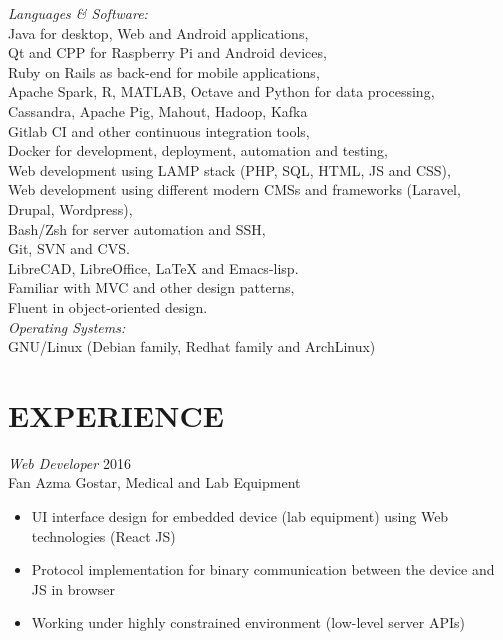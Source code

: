 \documentclass[margin, 10pt]{res} %
\begin{document}
\begin{resume}
{\sl Languages \& Software:} \\
Java for desktop, Web and Android applications, \\
Qt and CPP for Raspberry Pi and Android devices, \\
Ruby on Rails as back-end for mobile applications, \\
Apache Spark, R, MATLAB, Octave and Python for data processing, \\
Cassandra, Apache Pig, Mahout, Hadoop, Kafka \\
Gitlab CI and other continuous integration tools, \\
Docker for development, deployment, automation and testing, \\
Web development using LAMP stack (PHP, SQL, HTML, JS and CSS), \\
Web development using different modern CMSs and frameworks (Laravel, Drupal, Wordpress), \\
Bash/Zsh for server automation and SSH, \\
Git, SVN and CVS. \\
LibreCAD, LibreOffice, LaTeX and Emacs-lisp. \\
Familiar with MVC and other design patterns, \\
Fluent in object-oriented design. \\
{\sl Operating Systems:} \\
GNU/Linux (Debian family, Redhat family and ArchLinux)
 
 
\section{EXPERIENCE}

{\sl Web Developer} \hfill 2016 \\
Fan Azma Gostar, Medical and Lab Equipment \\

\begin{itemize} \itemsep -2pt %
\item UI interface design for embedded device (lab equipment) using Web
  technologies (React JS)
\item Protocol implementation for binary communication between the device and JS
  in browser
\item Working under highly constrained environment (low-level server APIs)
\end{itemize}


\end{resume}
\end{document}
